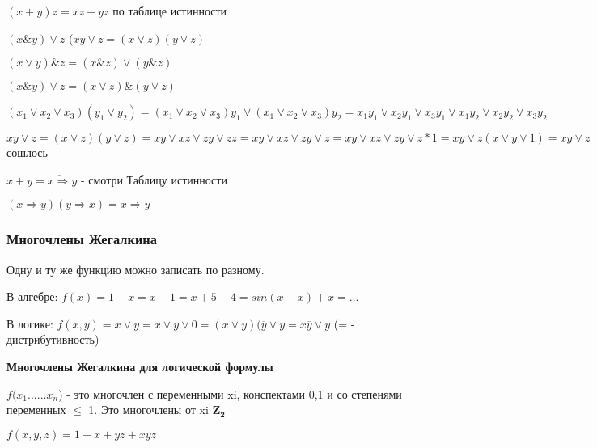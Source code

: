 \documentclass[russian]{lecture-notes}
\begin{document}
\begin{sloppypar}
\begin{proposition}
$(x+y)z = xz + yz$ по таблице истинности

$(x \& y ) \lor z$ ($xy \lor z = (x \lor z)(y \lor z)$

$(x \lor y) \& z = (x \& z) \lor (y \& z)$

$(x \& y) \lor z = (x \lor z) \& (y\lor z)$

\begin{remark}

$ $
    $(x_{1} \lor x_{2} \lor x_{3}) (y_{1} \lor y_{2}) = (x_{1} \lor x_{2} \lor x_{3})y_{1} \lor (x_{1} \lor x_{2} \lor x_{3})y_{2} = x_{1}y_{1} \lor x_{2}y_{1} \lor x_{3}y_{1} \lor x_{1}y_{2} \lor x_{2}y_{2} \lor x_{3}y_{2}$

    $xy \lor z = (x \lor z)(y\lor z) = xy \lor xz \lor zy \lor zz = xy \lor  xz \lor zy \lor z = xy \lor xz \lor zy \lor z*1 = xy \lor z(x\lor y \lor 1) = xy \lor z$ сошлось
    
\end{remark}

$x+y = \overline{x\Rightarrow}y$ - смотри Таблицу истинности

$(x\Rightarrow y)(y\Rightarrow x) = x \Rightarrow y$

\subsubsection{Многочлены Жегалкина}

    \begin{remark}
    
        Одну и ту же функцию можно записать по разному.
    
    \end{remark}
    
    В алгебре: $f(x) = 1 +x = x + 1 = x + 5 - 4 = sin(x-x) + x = ...$
    
    В логике: $f(x,y) = x \lor y = x \lor y \lor 0 = (x \lor y)(\overline{y} \lor y = x\overline{y} \lor y$ (= - дистрибутивность)
    
    \textbf{Многочлены Жегалкина для логической формулы}
    
    
    \begin{definition}
        $f(x_{1}......x_{n}$) - это многочлен с переменными xi, конспектами 0,1 и со степенями переменных $\leqslant$ 1. Это многочлены от xi $\mathbf{Z_{2}}$
    \end{definition}
    
    \begin{example}
    
        $f(x,y,z) = 1 + x + yz + xyz$
        

\end{example}
\end{proposition}
\end{sloppypar}
\end{document}
